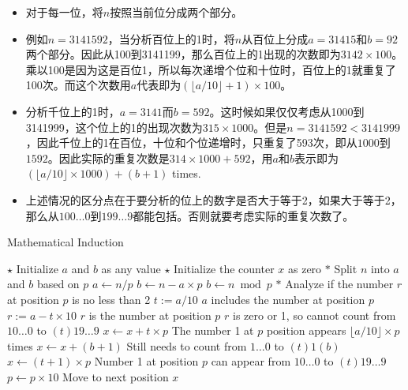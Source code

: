 \begin{itemize}
\item 对于每一位，将$n$按照当前位分成两个部分。
\item 例如$n=3141592$，当分析百位上的1时，将$n$从百位上分成$a=31415$和$b=92$两个部分。因此从100到3141199，那么百位上的1出现的次数即为$3142\times 100$。乘以100是因为这是百位1，所以每次递增个位和十位时，百位上的1就重复了100次。而这个次数用$a$代表即为$(\lfloor a/10\rfloor+1)\times 100$。
\item 分析千位上的1时，$a=3141$而$b=592$。这时候如果仅仅考虑从1000到3141999，这个位上的1的出现次数为$315\times 1000$。但是$n=3141592 < 3141999$，因此千位上的1在百位，十位和个位递增时，只重复了593次，即从$1000$到$1592$。因此实际的重复次数是$314\times 1000 + 592$，用$a$和$b$表示即为 $(\lfloor a / 10\rfloor \times 1000) + (b + 1)$ times.
\item 上述情况的区分点在于要分析的位上的数字是否大于等于2，如果大于等于2，那么从$100\ldots0$到$199\ldots9$都能包括。否则就要考虑实际的重复次数了。
\end{itemize}
\setcounter{algorithm}{0}
\begin{algorithm}[H]
\caption{Mathematical Induction}
\begin{algorithmic}[1]
\State $\star$ Initialize $a$ and $b$ as any value
\State $\star$ Initialize the counter $x$ as zero
\State $\ast$ Split $n$ into $a$ and $b$ based on $p$
\State $a\gets n / p$
\State $b\gets n - a\times p$ \Comment $b\gets n\bmod p$
\State $\ast$ Analyze if the number $r$ at position $p$ is no less than 2
\State $t:=a/10$ \Comment $a$ includes the number at position $p$
\State $r:=a-t\times 10$ \Comment $r$ is the number at position $p$
 \Comment $r$ is zero or 1, so cannot count from $10\ldots0$ to $(t)19\ldots9$
\State $x\gets x+ t\times p$ \Comment The number 1 at $p$ position appears $\lfloor a/10\rfloor \times p$ times
\State $x\gets x+(b+1)$ \Comment Still needs to count from $1\ldots 0$ to $(t)1(b)$
\EndIf
\Else
\State $x\gets (t+1)\times p$ \Comment Number 1 at position $p$ can appear from $10\ldots0$ to $(t)19\ldots9$
\EndIf
\State $p\gets p\times 10$ \Comment Move to next position
\EndFor
\State \Return $x$
\EndProcedure
\end{algorithmic}
\end{algorithm}
\setcounter{lstlisting}{0}
